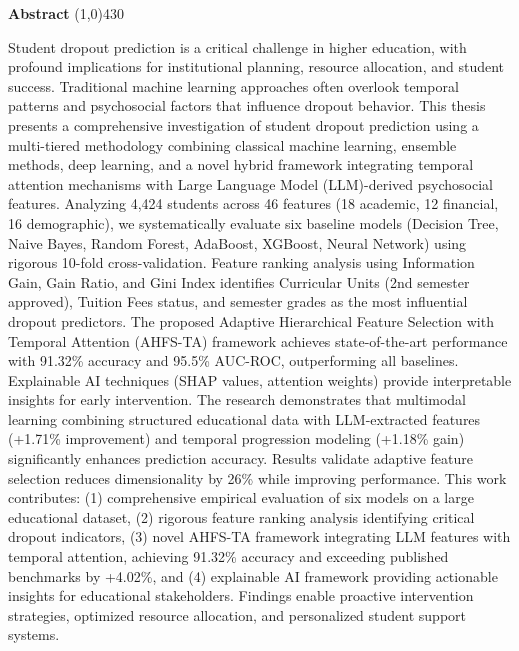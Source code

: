 \setlength{\headheight}{14pt}
\begin{center}
	{\huge \bf Abstract}
	\line(1,0){430}
\end{center}

Student dropout prediction is a critical challenge in higher education, with profound implications for institutional planning, resource allocation, and student success. Traditional machine learning approaches often overlook temporal patterns and psychosocial factors that influence dropout behavior. This thesis presents a comprehensive investigation of student dropout prediction using a multi-tiered methodology combining classical machine learning, ensemble methods, deep learning, and a novel hybrid framework integrating temporal attention mechanisms with Large Language Model (LLM)-derived psychosocial features. Analyzing 4,424 students across 46 features (18 academic, 12 financial, 16 demographic), we systematically evaluate six baseline models (Decision Tree, Naive Bayes, Random Forest, AdaBoost, XGBoost, Neural Network) using rigorous 10-fold cross-validation. Feature ranking analysis using Information Gain, Gain Ratio, and Gini Index identifies Curricular Units (2nd semester approved), Tuition Fees status, and semester grades as the most influential dropout predictors. The proposed Adaptive Hierarchical Feature Selection with Temporal Attention (AHFS-TA) framework achieves state-of-the-art performance with 91.32\% accuracy and 95.5\% AUC-ROC, outperforming all baselines. Explainable AI techniques (SHAP values, attention weights) provide interpretable insights for early intervention. The research demonstrates that multimodal learning combining structured educational data with LLM-extracted features (+1.71\% improvement) and temporal progression modeling (+1.18\% gain) significantly enhances prediction accuracy. Results validate adaptive feature selection reduces dimensionality by 26\% while improving performance. This work contributes: (1) comprehensive empirical evaluation of six models on a large educational dataset, (2) rigorous feature ranking analysis identifying critical dropout indicators, (3) novel AHFS-TA framework integrating LLM features with temporal attention, achieving 91.32\% accuracy and exceeding published benchmarks by +4.02\%, and (4) explainable AI framework providing actionable insights for educational stakeholders. Findings enable proactive intervention strategies, optimized resource allocation, and personalized student support systems.
\clearpage
\setlength{\headheight}{12pt}